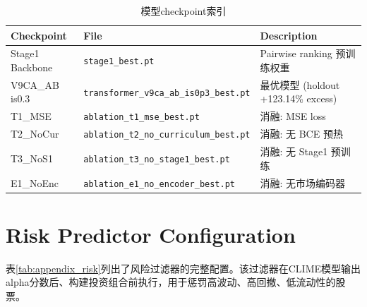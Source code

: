 \begin{table}[H]
\centering
\caption{模型checkpoint索引}
\begin{tabular}{@{}lll@{}}
\toprule
Checkpoint & File & Description \\
\midrule
Stage1 Backbone & \texttt{stage1\_best.pt} & Pairwise ranking 预训练权重 \\
V9CA\_AB is0.3 & \texttt{transformer\_v9ca\_ab\_is0p3\_best.pt} & 最优模型 (holdout +123.14\% excess) \\
T1\_MSE & \texttt{ablation\_t1\_mse\_best.pt} & 消融: MSE loss \\
T2\_NoCur & \texttt{ablation\_t2\_no\_curriculum\_best.pt} & 消融: 无 BCE 预热 \\
T3\_NoS1 & \texttt{ablation\_t3\_no\_stage1\_best.pt} & 消融: 无 Stage1 预训练 \\
E1\_NoEnc & \texttt{ablation\_e1\_no\_encoder\_best.pt} & 消融: 无市场编码器 \\
\bottomrule
\end{tabular}
\end{table}

\section{Risk Predictor Configuration}
\label{sec:appendix_risk}

表\ref{tab:appendix_risk}列出了风险过滤器的完整配置。该过滤器在CLIME模型输出alpha分数后、构建投资组合前执行，用于惩罚高波动、高回撤、低流动性的股票。

